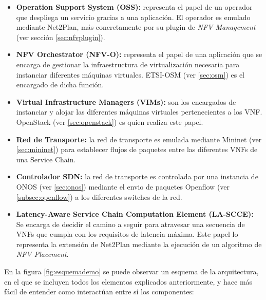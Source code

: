 \begin{itemize}
	\item \textbf{Operation Support System (OSS):} representa el papel de un operador que despliega un servicio gracias a una aplicación. El operador es emulado mediante Net2Plan, más concretamente por su plugin de \textit{NFV Management} (ver sección \ref{sec:nfvplugin}).
	
	\item \textbf{NFV Orchestrator (NFV-O):} representa el papel de una aplicación que se encarga de gestionar la infraestructura de virtualización necesaria para instanciar diferentes máquinas virtuales. ETSI-OSM (ver \ref{sec:osm}) es el encargado de dicha función.
	
	\item \textbf{Virtual Infrastructure Managers (VIMs):} son los encargados de instanciar y alojar las diferentes máquinas virtuales pertenecientes a los VNF. OpenStack (ver \ref{sec:openstack}) es quien realiza este papel.
	
	\item \textbf{Red de Transporte:} la red de transporte es emulada mediante Mininet (ver \ref{sec:mininet}) para establecer flujos de paquetes entre las diferentes VNFs de una Service Chain.
	
	\item \textbf{Controlador SDN:} la red de transporte es controlada por una instancia de ONOS (ver \ref{sec:onos}) mediante el envio de paquetes Openflow (ver \ref{subsec:openflow}) a los diferentes switches de la red.
	
	\item \textbf{Latency-Aware Service Chain Computation Element (LA-SCCE):} Se encarga de decidir el camino a seguir para atravesar una secuencia de VNFs que cumpla con los requisitos de latencia máxima. Este papel lo representa la extensión de Net2Plan mediante la ejecución de un algoritmo de \textit{NFV Placement}. 
\end{itemize}

En la figura \ref{fig:esquemademo} se puede observar un esquema de la arquitectura, en el que se incluyen todos los elementos explicados anteriormente, y hace más fácil de entender como interactúan entre sí los componentes:

